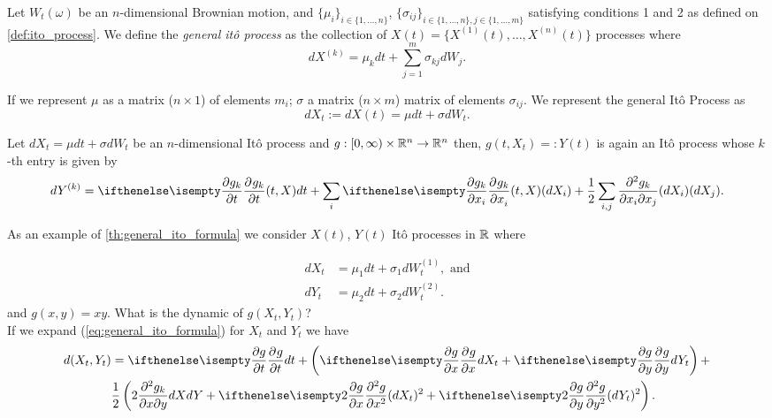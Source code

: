 \documentclass[../TGMAFFIRO.tex]{subfiles}
\begin{document}
\begin{definition}
	Let $W_t(\omega)$ be an $n$-dimensional Brownian motion, and $\{\mu_i\}_{i\in\{1,\ldots,n\}}$, $\{\sigma_{ij}\}_{i\in\{1,\ldots,n\}, j\in\{1,\ldots,m\}}$ satisfying conditions 1 and 2 as defined on \ref{def:ito_process}. We define the \textit{general it\^o process} as the collection of $X(t) = \{X^{(1)}(t), \ldots, X^{(n)}(t)\}$ processes where
	\begin{equation}
		dX^{(k)} = \mu_k dt + \sum_{j=1}^{m}\sigma_{kj} dW_j.
	\end{equation}

If we represent $\mu$ as a matrix ($n\times 1$) of elements $m_i$; $\sigma$ a matrix ($n\times m$) matrix of elements $\sigma_{ij}$. We represent the general It\^o Process as
\begin{equation}
  dX_t := dX(t) = \mu dt + \sigma dW_t.
\end{equation}
\end{definition}
	
\begin{theorem}\label{th:general_ito_formula}
	Let $dX_t = \mu dt + \sigma dW_t $ be an $n$-dimensional It\^o process and $g:[0,\infty)\times\mathbb{R}^n\to\mathbb{R}^n$ then, $g(t, X_t) =: Y(t)$ is again an It\^o process whose $k$-th entry is given by
	\begin{equation}
		dY^{(k)} = \partialwrt{g_k}{t}{(t, X)} dt + \sum_i \partialwrt{g_k}{x_i}{(t, X)}(dX_i) + \frac{1}{2}\sum_{i,j}\frac{\partial^2g_k}{\partial x_i\partial x_j} (dX_i)(dX_j).\label{eq:general_ito_formula}
	\end{equation}
\end{theorem}

As an example of \ref{th:general_ito_formula} we consider $X(t)$, $Y(t)$ It\^o processes in $\mathbb{R}$ where

\begin{align}
	dX_t &= \mu_1 dt + \sigma_1 dW^{(1)}_t\nonumber, \text{ and}\\
	dY_t &= \mu_2 dt + \sigma_2 dW^{(2)}_t\nonumber.
\end{align}
 and $g(x,y) = xy$. What is the dynamic of $g(X_t, Y_t)$?\\

If we expand (\ref{eq:general_ito_formula}) for $X_t$ and $Y_t$ we have
\begin{align}
  d(X_t, Y_t) &= \partialwrt{g}{t}{} dt + \left(\partialwrt{g}{x} dX_t + \partialwrt{g}{y} dY_t \right) + \nonumber \\
  & \frac{1}{2}\left(2\frac{\partial^2g_k}{\partial x\partial y} dX dY + \partialwrt[2]{g}{x} (dX_t)^2 + \partialwrt[2]{g}{y} (dY_t)^2 \right). \label{eqproof:ito_prod_formula}
\end{align}
\end{document}
